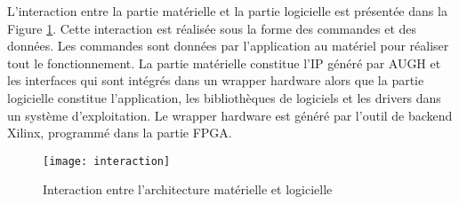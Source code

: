 L'interaction entre la partie matérielle et la partie logicielle est présentée dans la
Figure \ref{fig:interaction}. Cette interaction est réalisée sous la forme des commandes et des données.
Les commandes sont données par l'application au matériel pour réaliser tout le fonctionnement.
La partie matérielle constitue l'IP généré par AUGH et les interfaces qui sont intégrés
dans un wrapper hardware alors que la partie logicielle constitue
l'application, les bibliothèques de logiciels et les drivers dans un système d'exploitation. 
Le wrapper hardware est généré par l'outil de backend Xilinx, programmé dans la partie FPGA.

\begin{figure}[h]
	\centering
	\texttt{[image: interaction]}
	\caption{Interaction entre l'architecture matérielle et logicielle}
	\label{fig:interaction}
	\vspace{-2mm}
\end{figure}